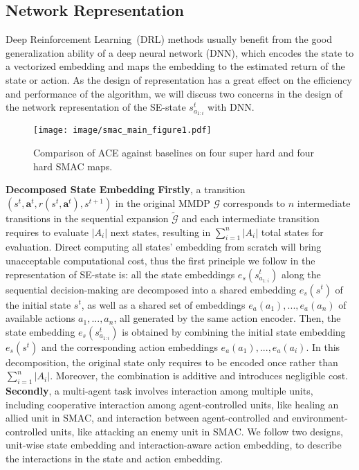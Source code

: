 \documentclass[letterpaper]{article} \usepackage{aaai23}  \usepackage{times}  \usepackage{helvet}  \usepackage{courier}  \usepackage[hyphens]{url}  \usepackage{graphicx} \urlstyle{rm} \def\UrlFont{\rm}  \usepackage{natbib}  \usepackage{caption} \frenchspacing  \setlength{\pdfpagewidth}{8.5in} \setlength{\pdfpageheight}{11in} \usepackage{algorithm}
\begin{document}
\subsection{Network Representation}
Deep Reinforcement Learning~(DRL) methods usually benefit from the good generalization ability of a deep neural network (DNN), which encodes the state to a vectorized embedding and maps the embedding to the estimated return of the state or action. As the design of representation has a great effect on the efficiency and performance of the algorithm, we will discuss two concerns in the design of the network representation of the SE-state $s_{a_{1:{i}}}^t$ with DNN.


\begin{figure*}[t]
    \centering
    \texttt{[image: image/smac\_main\_figure1.pdf]}
\vspace{-2ex}
    \caption{Comparison of ACE against baselines on four super hard and four hard SMAC maps.}
\vspace{-4ex}
    \label{fig:smac_main_figure}
\end{figure*}

\textbf{Decomposed State Embedding} \textbf{Firstly}, a transition $\left(s^t,\boldsymbol{a}^t,r\left(s^t,\boldsymbol{a}^t\right),s^{t+1}\right)$ in the original MMDP $\mathcal{G}$ corresponds to $n$ intermediate transitions in the sequential expansion $\widetilde{\mathcal{G}}$ and each intermediate transition requires to evaluate $\left| A_{i} \right|$ next states, resulting in $\sum_{i=1}^n \left| A_{i} \right|$ total states for evaluation. Direct computing all states' embedding from scratch will bring unacceptable computational cost, thus the first principle we follow in the representation of SE-state is: all the state embeddings $e_s\left(s_{a_{1:{i}}}^t\right)$ along the sequential decision-making are decomposed into a shared embedding $e_s\left(s^t\right)$ of the initial state $s^t$, as well as a shared set of embeddings $e_a\left(a_{1}\right),...,e_a\left(a_{n}\right)$ of available actions $a_{1},...,a_{n}$, all generated by the same action encoder. Then, the state embedding $e_s\left(s_{a_{1:{i}}}^t\right)$ is obtained by combining the initial state embedding $e_s\left(s^t\right)$ and the corresponding action embeddings $e_a\left(a_{1}\right),...,e_a\left(a_{i}\right)$. In this decomposition, the original state only requires to be encoded once rather than $\sum_{i=1}^n \left| A_{i} \right|$. Moreover, the combination is additive and introduces negligible cost. \textbf{Secondly}, a multi-agent task involves interaction among multiple units, including cooperative interaction among agent-controlled units, like healing an allied unit in SMAC, and interaction between agent-controlled and environment-controlled units, like attacking an enemy unit in SMAC. We follow two designs, unit-wise state embedding and interaction-aware action embedding, to describe the interactions in the state and action embedding.
\end{document}
